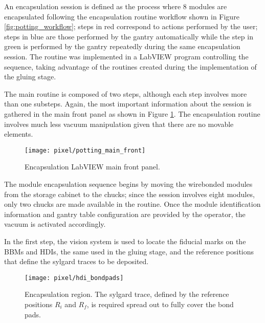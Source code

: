 An encapsulation session is defined as the process where 8 modules are encapsulated following the encapsulation routine workflow shown in Figure \ref{fig:potting_workflow}; steps in red correspond to actions performed by the user; steps in blue are those performed by the gantry automatically while the step in green is performed by the gantry repeatedly during the same encapsulation session. The routine was implemented in a LabVIEW program controlling the sequence, taking advantage of the routines created during the implementation of the gluing stage.   

The main routine is composed of two steps, although each step involves more than one substeps. Again, the most important information about the session is gathered in the main front panel as shown in Figure \ref{fig:potting_main_front}. The encapsulation routine involves much less vacuum manipulation given that there are no movable elements.

\begin{landscape}
\begin{figure}[h]
\begin{center}
    \vspace{-2.9cm}
    \hspace{-1cm}
    \texttt{[image: pixel/potting\_main\_front]}
    \caption[Encapsulation LabVIEW main front panel]{Encapsulation LabVIEW main front panel.}\label{fig:potting_main_front}
    \vspace{-2cm}
    \hspace{-2cm}
\end{center}
\end{figure}
\end{landscape}

The module encapsulation sequence begins by moving the wirebonded modules from the storage cabinet to the chucks; since the session involves eight modules, only two chucks are made available in the routine. Once the module identification information and gantry table configuration are provided by the operator, the vacuum is activated accordingly.

In the first step, the vision system is used to locate the fiducial marks on the BBMs and HDIs, the same used in the gluing stage, and the reference positions that define the sylgard traces to be deposited. 

\begin{figure}[h]
\begin{center}
  \texttt{[image: pixel/hdi\_bondpads]}
 \caption[Encapsulation region.]{Encapsulation region. The sylgard trace, defined by the reference positions $R_i$ and $R_f$, is required spread out to fully cover the bond pads. }\label{fig:hdi_bondpads}
\end{center}
\end{figure}

